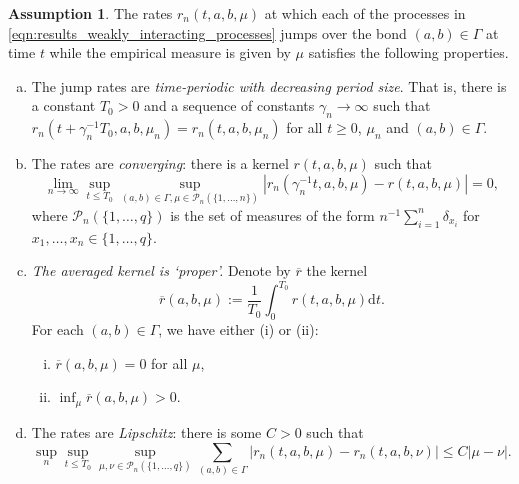 \documentclass[a4paper]{article}
\newcommand{\cP}{\mathcal{P}}
\newcommand{\dd}{ \mathrm{d}}
\numberwithin{equation}{section}
\theoremstyle{definition}
\newtheorem{assumption}[theorem]{Assumption}
\begin{document}
\begin{assumption} \label{assumption:jump_rates}
	The rates $r_n(t,a,b,\mu)$ at which each of the processes in \eqref{eqn:results_weakly_interacting_processes} jumps over the bond $(a,b) \in \Gamma$ at time $t$ while the empirical measure is given by $\mu$ satisfies the following properties.
	\begin{enumerate}[(a)]
		\item \label{item:results_time_periodic} The jump rates are \textit{time-periodic with decreasing period size}. That is, there is a constant $T_0 > 0$ and a sequence of constants $\gamma_n \rightarrow \infty$ such that $r_n(t + \gamma_n^{-1}T_0,a,b,\mu_n) = r_n(t,a,b,\mu_n)$ for all $t \geq 0$, $\mu_n$ and $(a,b) \in \Gamma$. 
		\item \label{item:results_convergence} The rates are \textit{converging}: there is a kernel $r(t,a,b,\mu)$ such that 
		\begin{equation*}
			\lim_{n \rightarrow \infty} \sup_{t \leq T_0} \sup_{(a,b) \in \Gamma, \mu \in \cP_n(\{1,\dots,n\})} \left|r_n(\gamma_n^{-1}t, a,b,\mu) - r(t,a,b,\mu) \right| = 0,
		\end{equation*}
		where $\cP_n(\{1,\dots,q\})$ is the set of measures of the form $n^{-1} \sum_{i = 1}^n \delta_{x_i}$ for $x_1,\dots,x_n \in \{1,\dots,q\}$.
		\item \label{item:results_rate_zero_or_positive} \textit{The averaged kernel is `proper'.} Denote by $\overline{r}$ the kernel 
		\begin{equation*}
			\overline{r}(a,b,\mu) := \frac{1}{T_0} \int_0^{T_0} r(t,a,b,\mu) \dd t.
		\end{equation*}
		For each $(a,b) \in \Gamma$, we have either (i) or (ii):
		\begin{enumerate}[(i)]
			\item $\overline{r}(a,b,\mu) = 0$ for all $\mu$,
			\item $\inf_{\mu} \overline{r}(a,b,\mu) > 0$.
		\end{enumerate}
		\item \label{item:results_Lipschitz} The rates are \textit{Lipschitz}: there is some $C > 0$ such that 
		\begin{equation*}
			\sup_n \sup_{t \leq T_0} \sup_{\mu,\nu \in \cP_n(\{1,\dots,q\})} \sum_{(a,b) \in \Gamma} \left|r_n(t,a,b,\mu) - r_n(t,a,b,\nu)\right| \leq C\left|\mu - \nu \right|.
		\end{equation*}
	\end{enumerate}
	
	
\end{assumption}
\end{document}
